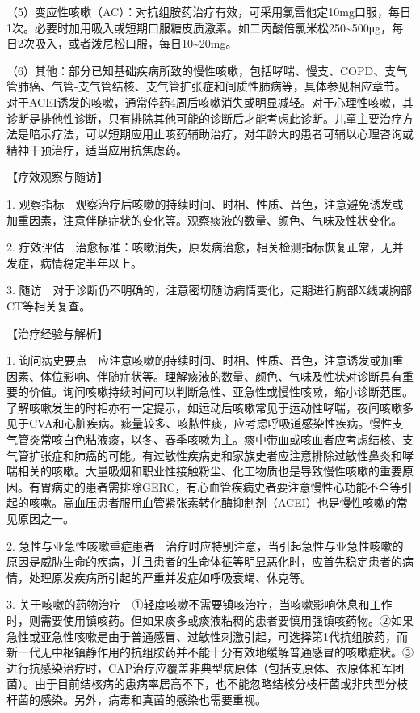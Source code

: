 （5）变应性咳嗽（AC）：对抗组胺药治疗有效，可采用氯雷他定10mg口服，每日1次。必要时加用吸入或短期口服糖皮质激素。如二丙酸倍氯米松250\textasciitilde{}500μg，每日2次吸入，或者泼尼松口服，每日10\textasciitilde{}20mg。

（6）其他：部分已知基础疾病所致的慢性咳嗽，包括哮喘、慢支、COPD、支气管肺癌、气管-支气管结核、支气管扩张症和间质性肺病等，具体参见相应章节。对于ACEI诱发的咳嗽，通常停药4周后咳嗽消失或明显减轻。对于心理性咳嗽，其诊断是排他性诊断，只有排除其他可能的诊断后才能考虑此诊断。儿童主要治疗方法是暗示疗法，可以短期应用止咳药辅助治疗，对年龄大的患者可辅以心理咨询或精神干预治疗，适当应用抗焦虑药。

【疗效观察与随访】

1.
观察指标　观察治疗后咳嗽的持续时间、时相、性质、音色，注意避免诱发或加重因素，注意伴随症状的变化等。观察痰液的数量、颜色、气味及性状变化。

2.
疗效评估　治愈标准：咳嗽消失，原发病治愈，相关检测指标恢复正常，无并发症，病情稳定半年以上。

3.
随访　对于诊断仍不明确的，注意密切随访病情变化，定期进行胸部X线或胸部CT等相关复查。

【治疗经验与解析】

1.
询问病史要点　应注意咳嗽的持续时间、时相、性质、音色，注意诱发或加重因素、体位影响、伴随症状等。理解痰液的数量、颜色、气味及性状对诊断具有重要的价值。询问咳嗽持续时间可以判断急性、亚急性或慢性咳嗽，缩小诊断范围。了解咳嗽发生的时相亦有一定提示，如运动后咳嗽常见于运动性哮喘，夜间咳嗽多见于CVA和心脏疾病。痰量较多、咳脓性痰，应考虑呼吸道感染性疾病。慢性支气管炎常咳白色粘液痰，以冬、春季咳嗽为主。痰中带血或咳血者应考虑结核、支气管扩张症和肺癌的可能。有过敏性疾病史和家族史者应注意排除过敏性鼻炎和哮喘相关的咳嗽。大量吸烟和职业性接触粉尘、化工物质也是导致慢性咳嗽的重要原因。有胃病史的患者需排除GERC，有心血管疾病史者要注意慢性心功能不全等引起的咳嗽。高血压患者服用血管紧张素转化酶抑制剂（ACEI）也是慢性咳嗽的常见原因之一。

2.
急性与亚急性咳嗽重症患者　治疗时应特别注意，当引起急性与亚急性咳嗽的原因是威胁生命的疾病，并且患者的生命体征等明显恶化时，应首先稳定患者的病情，处理原发疾病所引起的严重并发症如呼吸衰竭、休克等。

3.
关于咳嗽的药物治疗　①轻度咳嗽不需要镇咳治疗，当咳嗽影响休息和工作时，则需要使用镇咳药。但如果痰多或痰液粘稠的患者要慎用强镇咳药物。②如果急性或亚急性咳嗽是由于普通感冒、过敏性刺激引起，可选择第1代抗组胺药，而新一代无中枢镇静作用的抗组胺药并不能十分有效地缓解普通感冒的咳嗽症状。③进行抗感染治疗时，CAP治疗应覆盖非典型病原体（包括支原体、衣原体和军团菌）。由于目前结核病的患病率居高不下，也不能忽略结核分枝杆菌或非典型分枝杆菌的感染。另外，病毒和真菌的感染也需要重视。

